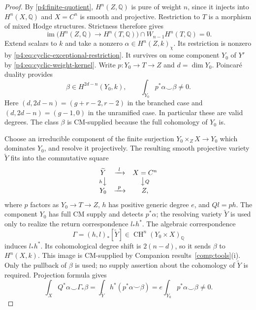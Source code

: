 \documentclass[11pt]{article}
\newcommand{\Q}{\mathbb Q}
\newcommand{\CH}{\operatorname{CH}}
\theoremstyle{plain}
\theoremstyle{definition}
\theoremstyle{remark}
\numberwithin{equation}{section}
\begin{document}
\begin{proof}
By \eqref{p4:finite-quotient}, $H^n(Z,\Q)$ is pure of weight
$n$, since it injects into $H^n(X,\Q)$ and $X=C^n$ is smooth
and projective.  Restriction to $T$ is a morphism of mixed
Hodge structures.  Strictness therefore gives
\[
 \operatorname{im}\big(H^n(Z,\Q)\to H^n(T,\Q)\big)
       \cap W_{n-1}H^n(T,\Q)=0.
\]
Extend scalars to $k$ and take a nonzero
$\alpha\in H^n(Z,k)_\chi$.  Its restriction is nonzero by
\eqref{p4:eq:cyclic-exceptional-restriction}.  It survives
on some component $Y_0$ of $Y'$ by
\eqref{p4:eq:cyclic-weight-kernel}.  Write
$p:Y_0\to T\to Z$ and $d=\dim Y_0$.  Poincar\'e duality
provides
\[
 \beta\in H^{2d-n}(Y_0,k),\qquad
 \int_{Y_0}p^*\alpha\smile\beta\ne0.
\]
Here $(d,2d-n)=(g+r-2,r-2)$ in the branched case and
$(d,2d-n)=(g-1,0)$ in the unramified case.  In particular
these are valid degrees.  The class $\beta$ is CM-supplied
because the full cohomology of $Y_0$ is.

Choose an irreducible component of the finite surjection
$Y_0\times_Z X\to Y_0$ which dominates $Y_0$, and resolve it
projectively.  The resulting smooth projective variety
$\widetilde Y$ fits into the commutative square
\[
 \begin{array}{ccc}
  \widetilde Y & \xrightarrow{\ l\ } & X=C^n\\
  {\scriptstyle h}\big\downarrow && \big\downarrow{\scriptstyle Q}\\
  Y_0 & \xrightarrow{\ p\ } & Z,
 \end{array}
\]
where $p$ factors as $Y_0\to T\to Z$, $h$ has positive generic degree
$e$, and $Ql=ph$.  The component $Y_0$ has full CM supply and detects
$p^*\alpha$; the resolving variety $\widetilde Y$ is used only to realize
the return correspondence $l_*h^*$.
The algebraic correspondence
\[
 \Gamma=(h,l)_*[\widetilde Y]\in\CH^n(Y_0\times X)_\Q
\]
induces $l_*h^*$.  Its cohomological degree shift is
$2(n-d)$, so it sends $\beta$ to $H^n(X,k)$.
This image is CM-supplied by Companion results~\ref{comp:tools}\textup{(i)}.
Only the pullback of $\beta$ is used; no supply assertion
about the cohomology of $\widetilde Y$ is required.
Projection formula gives
\begin{equation}
 \label{p4:eq:cyclic-return-pairing}
 \int_X Q^*\alpha\smile\Gamma_*\beta
 =\int_{\widetilde Y}h^*(p^*\alpha\smile\beta)
 =e\int_{Y_0}p^*\alpha\smile\beta\ne0.
\end{equation}


\end{proof}
\end{document}
